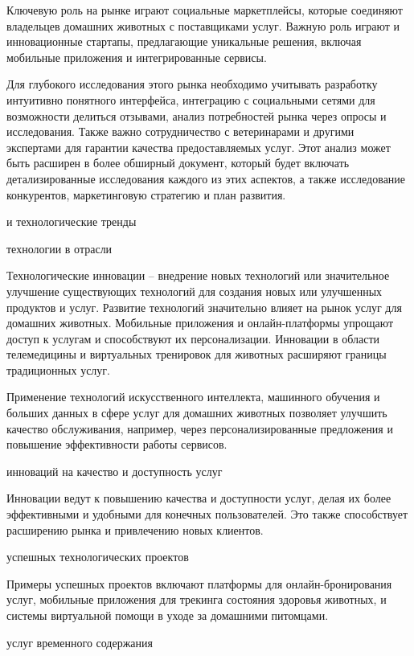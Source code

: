 Ключевую роль на рынке играют социальные маркетплейсы, которые соединяют владельцев домашних животных с поставщиками услуг. Важную роль играют и инновационные стартапы, предлагающие уникальные решения, включая мобильные приложения и интегрированные сервисы.

Для глубокого исследования этого рынка необходимо учитывать разработку интуитивно понятного интерфейса, интеграцию с социальными сетями для возможности делиться отзывами, анализ потребностей рынка через опросы и исследования. Также важно сотрудничество с ветеринарами и другими экспертами для гарантии качества предоставляемых услуг. Этот анализ может быть расширен в более обширный документ, который будет включать детализированные исследования каждого из этих аспектов, а также исследование конкурентов, маркетинговую стратегию и план развития.

 и технологические тренды

 технологии в отрасли

Технологические инновации – внедрение новых технологий или значительное улучшение существующих технологий для создания новых или улучшенных продуктов и услуг. Развитие технологий значительно влияет на рынок услуг для домашних животных. Мобильные приложения и онлайн-платформы упрощают доступ к услугам и способствуют их персонализации. Инновации в области телемедицины и виртуальных тренировок для животных расширяют границы традиционных услуг.

Применение технологий искусственного интеллекта, машинного обучения и больших данных в сфере услуг для домашних животных позволяет улучшить качество обслуживания, например, через персонализированные предложения и повышение эффективности работы сервисов.

 инноваций на качество и доступность услуг

Инновации ведут к повышению качества и доступности услуг, делая их более эффективными и удобными для конечных пользователей. Это также способствует расширению рынка и привлечению новых клиентов.

 успешных технологических проектов

Примеры успешных проектов включают платформы для онлайн-бронирования услуг, мобильные приложения для трекинга состояния здоровья животных, и системы виртуальной помощи в уходе за домашними питомцами.

 услуг временного содержания

